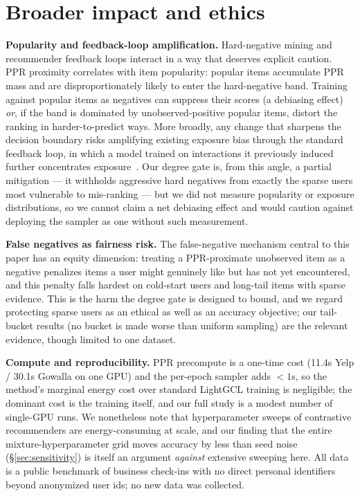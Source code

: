 \documentclass{article}
\begin{document}
\section{Broader impact and ethics}
\label{sec:impact}

\textbf{Popularity and feedback-loop amplification.} Hard-negative mining and
recommender feedback loops interact in a way that deserves explicit caution. PPR
proximity correlates with item popularity: popular items accumulate PPR mass and are
disproportionately likely to enter the hard-negative band. Training against popular
items as negatives can suppress their scores (a debiasing effect) \emph{or}, if the
band is dominated by unobserved-positive popular items, distort the ranking in
harder-to-predict ways. More broadly, any change that sharpens the decision boundary
risks amplifying existing exposure bias through the standard feedback loop, in which a
model trained on interactions it previously induced further concentrates
exposure~\cite{biassurvey}. Our degree gate is, from this angle, a partial
mitigation --- it withholds aggressive hard negatives from exactly the sparse users
most vulnerable to mis-ranking --- but we did not measure popularity or exposure
distributions, so we cannot claim a net debiasing effect and would caution against
deploying the sampler as one without such measurement.

\textbf{False negatives as fairness risk.} The false-negative mechanism central to this
paper has an equity dimension: treating a PPR-proximate unobserved item as a negative
penalizes items a user might genuinely like but has not yet encountered, and this
penalty falls hardest on cold-start users and long-tail items with sparse evidence.
This is the harm the degree gate is designed to bound, and we regard protecting sparse
users as an ethical as well as an accuracy objective; our tail-bucket results (no bucket
is made worse than uniform sampling) are the relevant evidence, though limited to one
dataset.

\textbf{Compute and reproducibility.} PPR precompute is a one-time cost (11.4s Yelp /
30.1s Gowalla on one GPU) and the per-epoch sampler adds $<\!1$s, so the method's
marginal energy cost over standard LightGCL training is negligible; the dominant cost
is the training itself, and our full study is a modest number of single-GPU runs. We
nonetheless note that hyperparameter sweeps of contrastive recommenders are
energy-consuming at scale, and our finding that the entire mixture-hyperparameter grid
moves accuracy by less than seed noise (\S\ref{sec:sensitivity}) is itself an argument
\emph{against} extensive sweeping here. All data is a public benchmark of business
check-ins with no direct personal identifiers beyond anonymized user ids; no new data
was collected.
\end{document}
